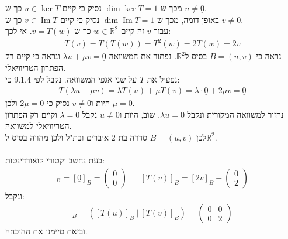 \documentclass{article}
\DeclareMathOperator\Image{Im}
\def\reals{\mathbb{R}}
\def\zerovec{\underline{0}}
\begin{document}
מכך ש $\dim \ker T=1$ נסיק כי קיים $u\in \ker T$ כך ש $u\ne\zerovec$. \\
באופן דומה, מכך ש $\dim\Image T=1$ נסיק כי קיים $v\in \Image T$ כך ש $v\ne 0$. \\
עבור $v$ זה קיים $w\in \reals^2$ כך ש $v=T(w)$. אי-לכך:
\begin{align*}
    T(v)=T(T(w))=T^2(w)=2T(w)=2v
\end{align*}
נראה כי $B=(u,v)$ בסיס ל$\reals^2$. נפתור את המשוואה $\lambda u+\mu v=\zerovec$ ונראה כי קיים רק הפתרון הטריוויאלי.\\
נפעיל את $T$ על שני אגפי המשוואה. נקבל לפי 9.1.4 כי:
\begin{align*}
    T(\lambda u+\mu v)=\lambda T(u)+\mu T(v)=\lambda \cdot \zerovec + 2\mu v = \zerovec
\end{align*}
היות ו$v\ne 0$ נסיק כי $2\mu =0$ ולכן $\mu=0$.\\
נחזור למשוואה המקורית ונקבל $\lambda u=0$. שוב, היות ו$u\ne0$ נקבל $\lambda=0$ וקיים רק הפתרון הטריוויאלי למשוואה.\\
לכן $B=(u,v)$ סדרה בת 2 איברים ובת"ל ולכן מהווה בסיס ל$\reals^2$.\\\\
כעת נחשב וקטורי קואורדינטות:
\begin{align*}
    [T(u)]_B=[\zerovec]_B=\begin{pmatrix}
        0 \\
        0
    \end{pmatrix}
     &  &
    [T(v)]_B=[2v]_B-\begin{pmatrix}
        0 \\
        2
    \end{pmatrix}
\end{align*}
ונקבל:
\begin{align*}
    [T]_B=([T(u)]_B \ | \ [T(v)]_B)=\begin{pmatrix}
        0 & 0 \\
        0 & 2
    \end{pmatrix}
\end{align*}
ובזאת סיימנו את ההוכחה.
\end{document}
